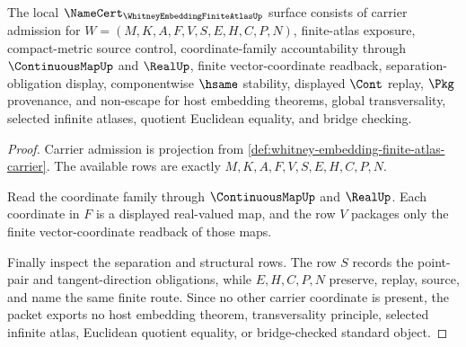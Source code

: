 \begin{theorem}
\label{thm:whitney-embedding-finite-atlas-namecert-obligations}
The local $\NameCert_{\WhitneyEmbeddingFiniteAtlasUp}$ surface consists of carrier admission for $W=(M,K,A,F,V,S,E,H,C,P,N)$, finite-atlas exposure, compact-metric source control, coordinate-family accountability through $\ContinuousMapUp$ and $\RealUp$, finite vector-coordinate readback, separation-obligation display, componentwise $\hsame$ stability, displayed $\Cont$ replay, $\Pkg$ provenance, and non-escape for host embedding theorems, global transversality, selected infinite atlases, quotient Euclidean equality, and bridge checking.
\end{theorem}
\begin{proof}
Carrier admission is projection from \autoref{def:whitney-embedding-finite-atlas-carrier}. The available rows are exactly $M,K,A,F,V,S,E,H,C,P,N$.

Read the coordinate family through $\ContinuousMapUp$ and $\RealUp$. Each coordinate in $F$ is a displayed real-valued map, and the row $V$ packages only the finite vector-coordinate readback of those maps.

Finally inspect the separation and structural rows. The row $S$ records the point-pair and tangent-direction obligations, while $E,H,C,P,N$ preserve, replay, source, and name the same finite route. Since no other carrier coordinate is present, the packet exports no host embedding theorem, transversality principle, selected infinite atlas, Euclidean quotient equality, or bridge-checked standard object.
\end{proof}

